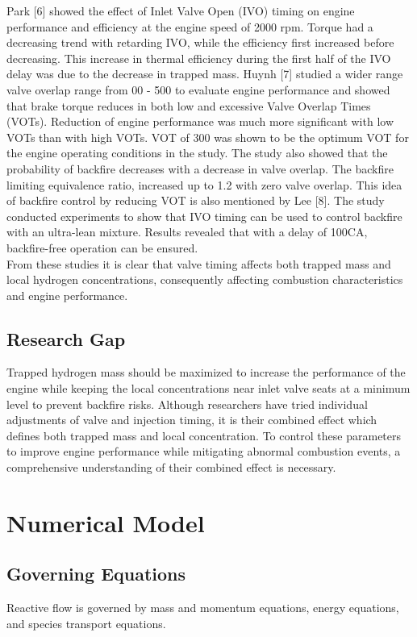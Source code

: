 \documentclass[conference]{IEEEtran}
\begin{document}
Park [6] showed the effect of Inlet Valve Open (IVO) timing on engine performance and efficiency at the engine speed of 2000 rpm.
Torque had a decreasing trend with retarding IVO, while the efficiency first increased before decreasing.
This increase in thermal efficiency during the first half of the IVO delay was due to the decrease in trapped mass.
Huynh [7] studied a wider range valve overlap range from 00 - 500 to evaluate engine performance and showed that brake torque reduces in both low and excessive Valve Overlap Times (VOTs).
Reduction of engine performance was much more significant with low VOTs than with high VOTs.
VOT of 300 was shown to be the optimum VOT for the engine operating conditions in the study.
The study also showed that the probability of backfire decreases with a decrease in valve overlap.
The backfire limiting equivalence ratio, increased up to 1.2 with zero valve overlap.
This idea of backfire control by reducing VOT is also mentioned by Lee [8].
The study conducted experiments to show that IVO timing can be used to control backfire with an ultra-lean mixture.
Results revealed that with a delay of 100CA, backfire-free operation can be ensured.\\

From these studies it is clear that valve timing affects both trapped mass and local hydrogen concentrations, consequently affecting combustion characteristics and engine performance.

\subsection{Research Gap}

Trapped hydrogen mass should be maximized to increase the performance of the engine while keeping the local concentrations near inlet valve seats at a minimum level to prevent backfire risks.
Although researchers have tried individual adjustments of valve and injection timing, it is their combined effect which defines both trapped mass and local concentration.
To control these parameters to improve engine performance while mitigating abnormal combustion events, a comprehensive understanding of their combined effect is necessary.

\section{Numerical Model}
\subsection{Governing Equations}
Reactive flow is governed by mass and momentum equations, energy equations, and species transport equations.
\end{document}
